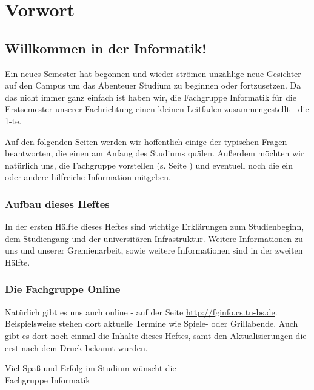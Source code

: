 
\section{Vorwort}
\label{vorwort}
	\begin{multicols}{2}
	\subsection*{Willkommen in der Informatik!}	

	Ein neues Semester hat begonnen und wieder strömen unzählige neue Gesichter auf den Campus um das Abenteuer Studium zu beginnen oder fortzusetzen. Da das nicht immer ganz einfach ist haben wir, die Fachgruppe Informatik für die Erstsemester unserer Fachrichtung einen kleinen Leitfaden zusammengestellt - die 1-te.

	Auf den folgenden Seiten werden wir hoffentlich einige der typischen Fragen beantworten, die einen am Anfang des Studiums quälen. Außerdem möchten wir natürlich uns, die Fachgruppe vorstellen (s. Seite \pageref{fachgruppe}) und eventuell noch die ein oder andere hilfreiche Information mitgeben. 

	\subsubsection*{Aufbau dieses Heftes}
		In der ersten Hälfte dieses Heftes sind wichtige
		Erklärungen zum Studienbeginn, dem Studiengang und der
		universitären Infrastruktur. Weitere Informationen zu
		uns und unserer Gremienarbeit, sowie weitere
		Informationen sind in der zweiten Hälfte.
	\subsubsection*{Die Fachgruppe Online}
		Natürlich gibt es uns auch online - auf der Seite \url{http://fginfo.cs.tu-bs.de}. Beispielsweise stehen dort aktuelle Termine wie Spiele- oder Grillabende. Auch gibt es dort noch einmal die Inhalte dieses Heftes, samt den Aktualisierungen die erst nach dem Druck bekannt wurden. 

	\vspace*{0.5cm}

	Viel Spaß und Erfolg im  Studium wünscht  die\\
	\hspace*{2cm}Fachgruppe Informatik
	\end{multicols}
